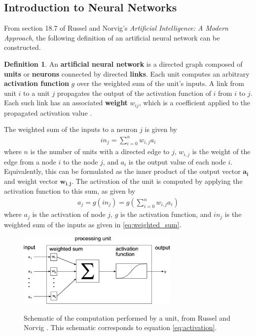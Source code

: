 \documentclass[12pt, titlepage]{report}
\theoremstyle{definition}
\newtheorem{definition}{Definition}
\begin{document}
\subsection{Introduction to Neural Networks}\label{subsection:neural_intro}
From section 18.7 of Russel and Norvig's \textit{Artificial Intelligence: A Modern Approach}, the following definition of an artificial neural network can be constructed.

\begin{definition}
An \textbf{artificial neural network} is a directed graph composed of \textbf{units} or \textbf{neurons} connected by directed \textbf{links}. Each unit computes an arbitrary \textbf{activation function} $g$ over the weighted sum of the unit's inputs. A link from unit $i$ to a unit $j$ propagates the output of the activation function of $i$ from $i$ to $j$. Each such link has an associated \textbf{weight} $w_{ij}$, which is a coefficient applied to the propagated activation value \cite[p. 727-731]{russel2009artificial}.
\end{definition}

The weighted sum of the inputs to a neuron $j$ is given by
\begin{gather}\label{eq:weighted_sum}
in_j = \sum_{i=0}^{n} w_{i,j}a_i
\end{gather}
where $n$ is the number of units with a directed edge to $j$, $w_{i,j}$ is the weight of the edge from a node $i$ to the node $j$, and $a_i$ is the output value of each node $i$. Equivalently, this can be formulated as the inner product of the output vector $\bm{a_i}$ and weight vector $\bm{w_{i,j}}$. The activation of the unit is computed by applying the activation function to this sum, as given by
\begin{gather}\label{eq:activation}
a_j = g(in_j) = g\left(\sum_{i=0}^{n} w_{i,j}a_i\right)
\end{gather}
where $a_j$ is the activation of node $j$, $g$ is the activation function, and $in_j$ is the weighted sum of the inputs as given in \ref{eq:weighted_sum}.

\begin{figure}
\centering
\includegraphics[width=0.7\textwidth]{img/neuron.png}\\
\caption{Schematic of the computation performed by a unit, from Russel and Norvig \cite[p.728]{russel2009artificial}. This schematic corresponds to equation \ref{eq:activation}.}
\label{figure:neural_unit}
\end{figure}
\end{document}
